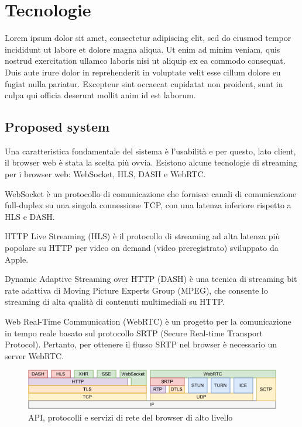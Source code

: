 %
%
\chapter{Tecnologie}

Lorem ipsum dolor sit amet, consectetur adipiscing elit, sed do eiusmod tempor incididunt ut labore et dolore magna aliqua. Ut enim ad minim veniam, quis nostrud exercitation ullamco laboris nisi ut aliquip ex ea commodo consequat. Duis aute irure dolor in reprehenderit in voluptate velit esse cillum dolore eu fugiat nulla pariatur. Excepteur sint occaecat cupidatat non proident, sunt in culpa qui officia deserunt mollit anim id est laborum.

\section{Proposed system}
Una caratteristica fondamentale del sistema è l'usabilità e per questo, lato client, il browser web è stata la scelta più ovvia.
Esistono alcune tecnologie di streaming per i browser web: WebSocket, HLS, DASH e WebRTC\cite{Audio_and_video_delivery}.

WebSocket è un protocollo di comunicazione che fornisce canali di comunicazione full-duplex su una singola connessione TCP, con una latenza inferiore rispetto a HLS e DASH.

HTTP Live Streaming (HLS) è il protocollo di streaming ad alta latenza più popolare su HTTP per video on demand (video preregistrato) sviluppato da Apple.

Dynamic Adaptive Streaming over HTTP (DASH) è una tecnica di streaming bit rate adattiva di Moving Picture Experts Group (MPEG), che consente lo streaming di alta qualità di contenuti multimediali su HTTP.

Web Real-Time Communication (WebRTC) è un progetto per la comunicazione in tempo reale basato sul protocollo SRTP (Secure Real-time Transport Protocol). Pertanto, per ottenere il flusso SRTP nel browser è necessario un server WebRTC\cite{High_Performance_Browser_Networking}.

\begin{figure}[H]
	\includegraphics[width=\linewidth]{immagini/webprotocols}
	\caption{API, protocolli e servizi di rete del browser di alto livello}
	\label{fig:webprotocols}
\end{figure}

